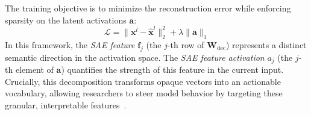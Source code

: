 \documentclass[11pt,letterpaper]{mystyle}
\begin{document}
The training objective is to minimize the reconstruction error while enforcing sparsity on the latent activations $\mathbf{a}$:
\begin{equation}
\mathcal{L} = \|\mathbf{x}^l - \hat{\mathbf{x}}^l\|_2^2 + \lambda \|\mathbf{a}\|_1
\end{equation}
In this framework, the \textit{SAE feature} $\mathbf{f}_j$ (the $j$-th row of $\mathbf{W}_{\text{dec}}$) represents a distinct semantic direction in the activation space. The \textit{SAE feature activation} $a_j$ (the $j$-th element of $\mathbf{a}$) quantifies the strength of this feature in the current input. Crucially, this decomposition transforms opaque vectors into an actionable vocabulary, allowing researchers to steer model behavior by targeting these granular, interpretable features~\citep{templeton2024scaling,lieberum-etal-2024-gemma,he2025saif,xu2025beyond,cho2025toward,li2025training}.
\end{document}
